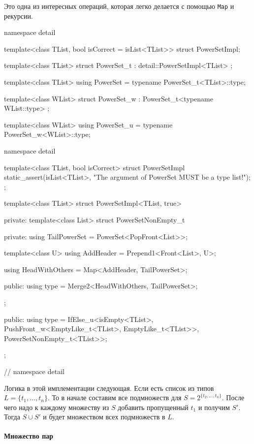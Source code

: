 Это одна из интересных операций, которая легко делается с помощью \verb"Map" и рекурсии.
\begin{cppcode}
namespace detail {

template<class TList, bool isCorrect = isList<TList>>
struct PowerSetImpl;
}

template<class TList>
struct PowerSet_t : detail::PowerSetImpl<TList> {};

template<class TList>
using PowerSet = typename PowerSet_t<TList>::type;

template<class WList>
struct PowerSet_w : PowerSet_t<typename WList::type> {};

template<class WList>
using PowerSet_u = typename PowerSet_w<WList>::type;

namespace detail {

template<class TList, bool isCorrect>
struct PowerSetImpl {
  static_assert(isList<TList>, "The argument of PowerSet MUST be a type list!");
};

template<class TList>
struct PowerSetImpl<TList, true> {
private:
  template<class List>
  struct PowerSetNonEmpty_t {
  private:
    using TailPowerSet = PowerSet<PopFront<List>>;

    template<class U>
    using AddHeader = Prepend1<Front<List>, U>;

    using HeadWithOthers = Map<AddHeader, TailPowerSet>;

  public:
    using type = Merge2<HeadWithOthers, TailPowerSet>;
  };

public:
  using type = IfElse_u<isEmpty<TList>,
                        PushFront_w<EmptyLike_t<TList>, EmptyLike_t<TList>>,
                        PowerSetNonEmpty_t<TList>>;
};
} // namespace detail
\end{cppcode}
Логика в этой имплементации следующая.
Если есть список из типов $L = \{t_1,\ldots, t_n\}$.
То в начале составим все подмножеств для $S = 2^{\{t_2, \ldots, t_n\}}$.
После чего надо к каждому множеству из $S$ добавить пропущенный $t_1$ и получим $S'$.
Тогда $S\cup S'$ и будет множеством всех подмножеств в $L$.

\paragraph{Множество пар}

